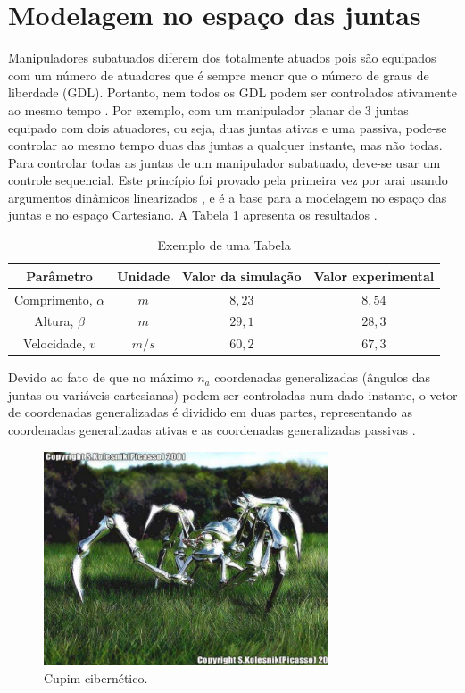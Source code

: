 \section{Modelagem no espaço das juntas}
Manipuladores subatuados diferem dos totalmente atuados pois são equipados com um número de atuadores que é sempre menor que o número de graus de liberdade (GDL). Portanto, nem todos os GDL podem ser controlados ativamente ao mesmo tempo \cite{Sbornian2004}. Por exemplo, com um manipulador planar de 3 juntas equipado com dois atuadores, ou seja, duas juntas ativas e
uma passiva, pode-se controlar ao mesmo tempo duas das juntas a qualquer instante, mas não todas. Para controlar todas as juntas de um manipulador subatuado, deve-se usar um controle sequencial. Este princípio foi provado pela primeira vez por {arai} usando  argumentos dinâmicos linearizados \cite{Joea2003}, e é a base para a modelagem no espaço das juntas e no espaço Cartesiano. A Tabela \ref{minhatab} apresenta os resultados \cite{Assenmacher1993,Silberschatz1991,Caromel1998}.

\begin{table}
\caption{Exemplo de uma Tabela}
\label{minhatab}

\center
\begin{tabular}{cccc}
  \hline
	Parâmetro & Unidade & Valor da simulação & Valor experimental   \\
	\hline
  Comprimento, $\alpha$ & $m$ &  $8,23$  & $8,54$ \\
  Altura, $\beta$ & $m$     &  $29,1$ & $28,3$\\
	Velocidade, $v$ & $m/s$  &  $60,2$ & $67,3$\\
	\hline
\end{tabular}
\end{table}

Devido ao fato de que no máximo $n_{a}$ coordenadas generalizadas (ângulos das juntas ou variáveis cartesianas) podem ser controladas num dado instante, o vetor de coordenadas generalizadas é dividido em duas partes, representando as coordenadas generalizadas ativas e as coordenadas generalizadas passivas \cite{Callaghan1995}.

\begin{figure}[ht]
\centering
\includegraphics[width=0.75\textwidth]{Cap2/spiderrobot}
\caption{Cupim cibernético.}\label{FDIII}
\end{figure}

